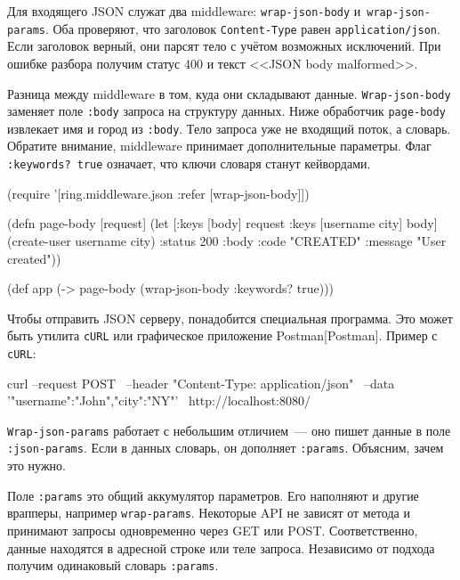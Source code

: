 Для входящего JSON служат два middleware: \verb|wrap-json-body|
и~\verb|wrap-json-params|. Оба проверяют, что заголовок \verb|Content-Type|
равен \verb|application/json|. Если заголовок верный, они парсят тело с учётом
возможных исключений. При ошибке разбора получим статус 400 и текст <<JSON body
malformed>>.

Разница между middleware в том, куда они складывают
данные. \verb|Wrap-json-body| заменяет поле \verb|:body| запроса на
структуру данных. Ниже обработчик \verb|page-body| извлекает имя и город из
\verb|:body|. Тело запроса уже не входящий поток, а словарь. Обратите
внимание, middleware принимает дополнительные параметры. Флаг \verb|:keywords? true|
означает, что ключи словаря станут кейвордами.

\begin{english}
  \begin{clojure}
(require '[ring.middleware.json :refer [wrap-json-body]])

(defn page-body [request]
  (let [{:keys [body]} request
        {:keys [username city]} body]
    (create-user username city)
    {:status 200
     :body {:code "CREATED"
            :message "User created"}}))

(def app (-> page-body
             (wrap-json-body {:keywords? true})))
  \end{clojure}
\end{english}


Чтобы отправить JSON серверу, понадобится специальная программа. Это может быть
утилита \verb|cURL| или графическое приложение
Postman[Post\-man]. Пример с \verb|cURL|:

\begin{english}
  \begin{bash}
curl --request POST \
     --header "Content-Type: application/json" \
     --data '{"username":"John","city":"NY"}' \
     http://localhost:8080/
  \end{bash}
\end{english}

\verb|Wrap-json-params| работает с небольшим отличием~--- оно пишет данные в
поле \verb|:json-params|. Если в данных словарь, он дополняет
\verb|:params|. Объясним, зачем это нужно.

Поле \verb|:params| это общий аккумулятор параметров. Его наполняют и другие
врапперы, например \verb|wrap-params|. Некоторые API не зависят от метода и
принимают запросы одновременно через GET или POST. Соответственно, данные
находятся в адресной строке или теле запроса. Независимо от подхода получим
одинаковый словарь \verb|:params|.


